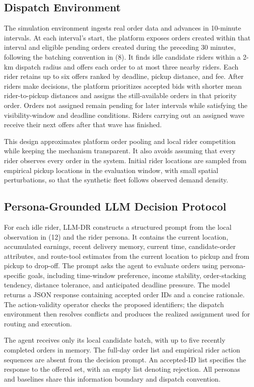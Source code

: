 \documentclass[letterpaper,journal]{IEEEtran}
\begin{document}
\subsection{Dispatch Environment}
The simulation environment ingests real order data and advances in 10-minute intervals. At each interval's start, the platform exposes orders created within that interval and eligible pending orders created during the preceding 30 minutes, following the batching convention in (8). It finds idle candidate riders within a 2-km dispatch radius and offers each order to at most three nearby riders. Each rider retains up to six offers ranked by deadline, pickup distance, and fee. After riders make decisions, the platform prioritizes accepted bids with shorter mean rider-to-pickup distances and assigns the still-available orders in that priority order. Orders not assigned remain pending for later intervals while satisfying the visibility-window and deadline conditions. Riders carrying out an assigned wave receive their next offers after that wave has finished.

This design approximates platform order pooling and local rider competition while keeping the mechanism transparent. It also avoids assuming that every rider observes every order in the system. Initial rider locations are sampled from empirical pickup locations in the evaluation window, with small spatial perturbations, so that the synthetic fleet follows observed demand density.

\subsection{Persona-Grounded LLM Decision Protocol}
For each idle rider, LLM-DR constructs a structured prompt from the local observation in (12) and the rider persona. It contains the current location, accumulated earnings, recent delivery memory, current time, candidate-order attributes, and route-tool estimates from the current location to pickup and from pickup to drop-off. The prompt asks the agent to evaluate orders using persona-specific goals, including time-window preference, income stability, order-stacking tendency, distance tolerance, and anticipated deadline pressure. The model returns a JSON response containing accepted order IDs and a concise rationale. The action-validity operator checks the proposed identifiers; the dispatch environment then resolves conflicts and produces the realized assignment used for routing and execution.

The agent receives only its local candidate batch, with up to five recently completed orders in memory. The full-day order list and empirical rider action sequences are absent from the decision prompt. An accepted-ID list specifies the response to the offered set, with an empty list denoting rejection. All personas and baselines share this information boundary and dispatch convention.
\end{document}
